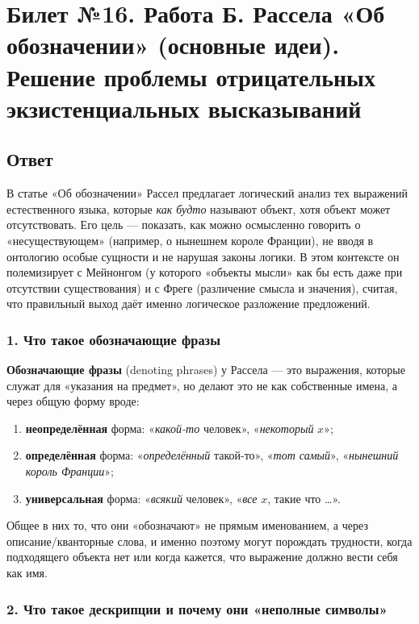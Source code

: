 \documentclass[a4paper,12pt]{article}
\begin{document}
\newpage
\section{Билет №16. Работа Б. Рассела «Об обозначении» (основные идеи). Решение проблемы отрицательных экзистенциальных высказываний}

\subsection{Ответ}

В статье «Об обозначении» Рассел предлагает логический анализ тех выражений естественного языка, которые \emph{как будто} называют объект, хотя объект может отсутствовать. Его цель --- показать, как можно осмысленно говорить о «несуществующем» (например, о нынешнем короле Франции), не вводя в онтологию особые сущности и не нарушая законы логики. В этом контексте он полемизирует с Мейнонгом (у которого «объекты мысли» как бы есть даже при отсутствии существования) и с Фреге (различение смысла и значения), считая, что правильный выход даёт именно логическое разложение предложений.

\subsubsection*{1. Что такое обозначающие фразы}

\textbf{Обозначающие фразы} (denoting phrases) у Рассела --- это выражения, которые служат для «указания на предмет», но делают это не как собственные имена, а через общую форму вроде:
\begin{enumerate}
    \item \textbf{неопределённая} форма: «\emph{какой-то} человек», «\emph{некоторый} $x$»;
    \item \textbf{определённая} форма: «\emph{определённый} такой-то», «\emph{тот самый}», «\emph{нынешний король Франции}»;
    \item \textbf{универсальная} форма: «\emph{всякий} человек», «\emph{все} $x$, такие что \dots».
\end{enumerate}
Общее в них то, что они «обозначают» не прямым именованием, а через описание/кванторные слова, и именно поэтому могут порождать трудности, когда подходящего объекта нет или когда кажется, что выражение должно вести себя как имя.

\subsubsection*{2. Что такое дескрипции и почему они «неполные символы»}
\end{document}
